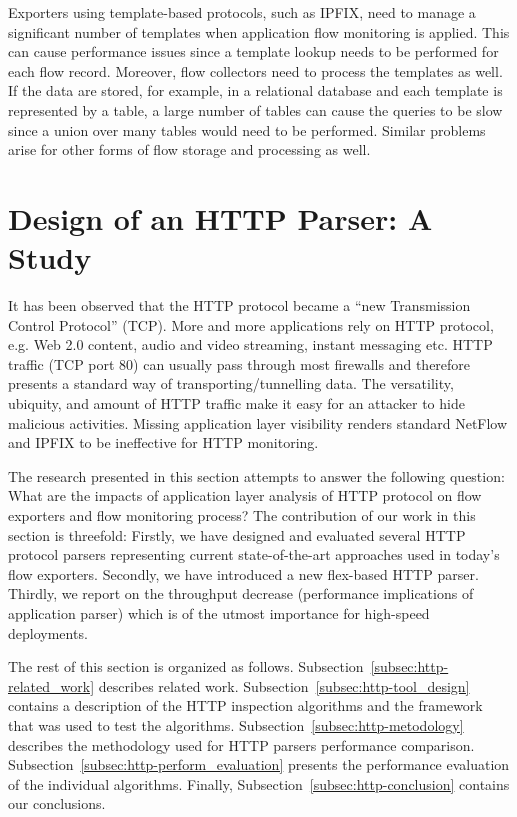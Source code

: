 Exporters using template-based protocols, such as IPFIX, need to manage a significant number of templates when application flow monitoring is applied. This can cause performance issues since a template lookup needs to be performed for each flow record. Moreover, flow collectors need to process the templates as well. If the data are stored, for example, in a relational database and each template is represented by a table, a large number of tables can cause the queries to be slow since a union over many tables would need to be performed. Similar problems arise for other forms of flow storage and processing as well.


\section{Design of an HTTP Parser: A Study}\label{sec:http-parser-design}

It has been observed that the HTTP protocol became a ``new Transmission Control Protocol'' (TCP). More and more applications rely on HTTP protocol, e.g. Web 2.0 content, audio and video streaming, instant messaging etc. HTTP traffic (TCP port 80) can usually pass through most firewalls and therefore presents a standard way of transporting/tunnelling data. The versatility, ubiquity, and amount of HTTP traffic make it easy for an attacker to hide malicious activities. Missing application layer visibility renders standard NetFlow and IPFIX to be ineffective for HTTP monitoring.

The research presented in this section attempts to answer the following question: What are the impacts of application layer analysis of HTTP protocol on flow exporters and flow monitoring process? The contribution of our work in this section is threefold: Firstly, we have designed and evaluated several HTTP protocol parsers representing current state-of-the-art approaches used in today's flow exporters. Secondly, we have introduced a new flex-based HTTP parser. Thirdly, we report on the throughput decrease (performance implications of application parser) which is of the utmost importance for high-speed deployments.

The rest of this section is organized as follows. Subsection~\ref{subsec:http-related_work} describes related work. Subsection~\ref{subsec:http-tool_design} contains a description of the HTTP inspection algorithms and the framework that was used to test the algorithms. Subsection~\ref{subsec:http-metodology} describes the methodology used for HTTP parsers performance comparison. Subsection~\ref{subsec:http-perform_evaluation} presents the performance evaluation of the individual algorithms. Finally, Subsection~\ref{subsec:http-conclusion} contains our conclusions.

